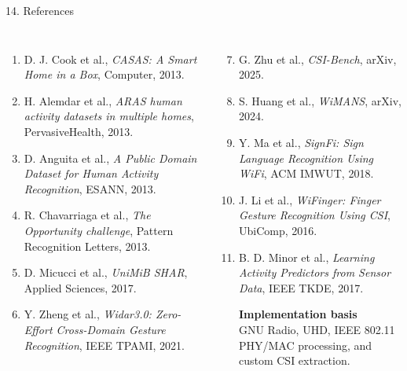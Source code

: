\documentclass[aspectratio=169,11pt]{beamer}
\begin{document}
\begin{frame}{14. References}

\footnotesize %

\begin{columns}[T,totalwidth=\textwidth]


\begin{enumerate}
\setlength{\itemsep}{3pt} %

\item D. J. Cook et al.,
\textit{CASAS: A Smart Home in a Box},
Computer, 2013.

\item H. Alemdar et al.,
\textit{ARAS human activity datasets in multiple homes},
PervasiveHealth, 2013.

\item D. Anguita et al.,
\textit{A Public Domain Dataset for Human Activity Recognition},
ESANN, 2013.

\item R. Chavarriaga et al.,
\textit{The Opportunity challenge},
Pattern Recognition Letters, 2013.

\item D. Micucci et al.,
\textit{UniMiB SHAR},
Applied Sciences, 2017.

\item Y. Zheng et al.,
\textit{Widar3.0: Zero-Effort Cross-Domain Gesture Recognition},
IEEE TPAMI, 2021.

\end{enumerate}


\begin{enumerate}
\setcounter{enumi}{6}
\setlength{\itemsep}{3pt} %

\item G. Zhu et al.,
\textit{CSI-Bench},
arXiv, 2025.

\item S. Huang et al.,
\textit{WiMANS},
arXiv, 2024.

\item Y. Ma et al.,
\textit{SignFi: Sign Language Recognition Using WiFi},
ACM IMWUT, 2018.

\item J. Li et al.,
\textit{WiFinger: Finger Gesture Recognition Using CSI},
UbiComp, 2016.

\item B. D. Minor et al.,
\textit{Learning Activity Predictors from Sensor Data},
IEEE TKDE, 2017.

\vspace{0.15cm} %

\textbf{\color{AmritaMaroon}Implementation basis}\\
GNU Radio, UHD, IEEE 802.11 PHY/MAC processing,
and custom CSI extraction.

\end{enumerate}

\end{columns}

\end{frame}
\end{document}
